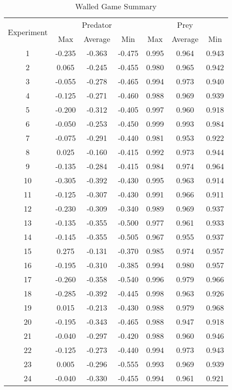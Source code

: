 \begin{table}
  \centering
  \begin{tabular}{|c|c|c|c|c|c|c|}
    \hline
    \multirow{2}{*}{Experiment} & \multicolumn{3}{|c|}{Predator} & \multicolumn{3}{|c|}{Prey} \\\cline{2-7}
    & Max & Average & Min & Max & Average & Min\\
    \hline
    1 & -0.235 & -0.363 & -0.475 & 0.995 & 0.964 & 0.943 \\
2 & 0.065 & -0.245 & -0.455 & 0.980 & 0.965 & 0.942 \\
3 & -0.055 & -0.278 & -0.465 & 0.994 & 0.973 & 0.940 \\
4 & -0.125 & -0.271 & -0.460 & 0.988 & 0.969 & 0.939 \\
5 & -0.200 & -0.312 & -0.405 & 0.997 & 0.960 & 0.918 \\
6 & -0.050 & -0.253 & -0.450 & 0.999 & 0.993 & 0.984 \\
7 & -0.075 & -0.291 & -0.440 & 0.981 & 0.953 & 0.922 \\
8 & 0.025 & -0.160 & -0.415 & 0.992 & 0.973 & 0.944 \\
9 & -0.135 & -0.284 & -0.415 & 0.984 & 0.974 & 0.964 \\
10 & -0.305 & -0.392 & -0.430 & 0.995 & 0.963 & 0.914 \\
11 & -0.125 & -0.307 & -0.430 & 0.991 & 0.966 & 0.911 \\
12 & -0.230 & -0.309 & -0.340 & 0.989 & 0.969 & 0.937 \\
13 & -0.135 & -0.355 & -0.500 & 0.977 & 0.961 & 0.933 \\
14 & -0.145 & -0.355 & -0.505 & 0.967 & 0.955 & 0.937 \\
15 & 0.275 & -0.131 & -0.370 & 0.985 & 0.974 & 0.957 \\
16 & -0.195 & -0.310 & -0.385 & 0.994 & 0.980 & 0.957 \\
17 & -0.260 & -0.358 & -0.540 & 0.996 & 0.979 & 0.966 \\
18 & -0.285 & -0.392 & -0.445 & 0.998 & 0.963 & 0.926 \\
19 & 0.015 & -0.213 & -0.430 & 0.988 & 0.979 & 0.968 \\
20 & -0.195 & -0.343 & -0.465 & 0.988 & 0.947 & 0.918 \\
21 & -0.040 & -0.297 & -0.420 & 0.988 & 0.960 & 0.946 \\
22 & -0.125 & -0.273 & -0.440 & 0.994 & 0.973 & 0.943 \\
23 & 0.005 & -0.296 & -0.555 & 0.993 & 0.969 & 0.939 \\
24 & -0.040 & -0.330 & -0.455 & 0.994 & 0.961 & 0.921 \\

    \hline
  \end{tabular}
  \caption{Walled Game Summary}
  \label{tab:walled-summary}
\end{table}